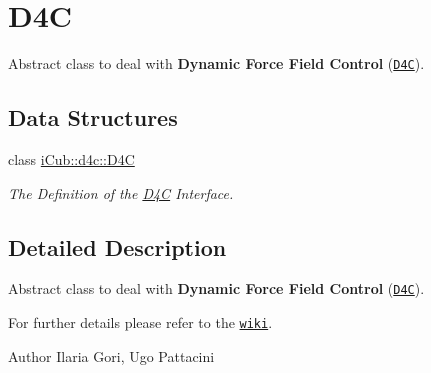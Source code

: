 \section{D4\+C}
\label{group__d4c}


Abstract class to deal with {\bfseries Dynamic Force Field Control} (\href{http://dx.doi.org/10.1109/HUMANOIDS.2012.6651573}{\tt D4\+C}).  


\subsection*{Data Structures}
\begin{DoxyCompactItemize}
\item 
class \hyperlink{classiCub_1_1d4c_1_1D4C}{i\+Cub\+::d4c\+::\+D4\+C}
\begin{DoxyCompactList}\small\item\em The Definition of the \hyperlink{classiCub_1_1d4c_1_1D4C}{D4\+C} Interface. \end{DoxyCompactList}\end{DoxyCompactItemize}


\subsection{Detailed Description}
Abstract class to deal with {\bfseries Dynamic Force Field Control} (\href{http://dx.doi.org/10.1109/HUMANOIDS.2012.6651573}{\tt D4\+C}). 

For further details please refer to the \href{http://wiki.icub.org/wiki/D4C Framework}{\tt wiki}.

\begin{DoxyAuthor}{Author}
Ilaria Gori, Ugo Pattacini 
\end{DoxyAuthor}
